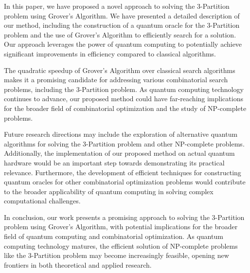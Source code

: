 In this paper, we have proposed a novel approach to solving the 3-Partition problem using Grover's Algorithm. We have presented a detailed description of our method, including the construction of a quantum oracle for the 3-Partition problem and the use of Grover's Algorithm to efficiently search for a solution. Our approach leverages the power of quantum computing to potentially achieve significant improvements in efficiency compared to classical algorithms.

The quadratic speedup of Grover's Algorithm over classical search algorithms makes it a promising candidate for addressing various combinatorial search problems, including the 3-Partition problem. As quantum computing technology continues to advance, our proposed method could have far-reaching implications for the broader field of combinatorial optimization and the study of NP-complete problems.

Future research directions may include the exploration of alternative quantum algorithms for solving the 3-Partition problem and other NP-complete problems. Additionally, the implementation of our proposed method on actual quantum hardware would be an important step towards demonstrating its practical relevance. Furthermore, the development of efficient techniques for constructing quantum oracles for other combinatorial optimization problems would contribute to the broader applicability of quantum computing in solving complex computational challenges.

In conclusion, our work presents a promising approach to solving the 3-Partition problem using Grover's Algorithm, with potential implications for the broader field of quantum computing and combinatorial optimization. As quantum computing technology matures, the efficient solution of NP-complete problems like the 3-Partition problem may become increasingly feasible, opening new frontiers in both theoretical and applied research.

